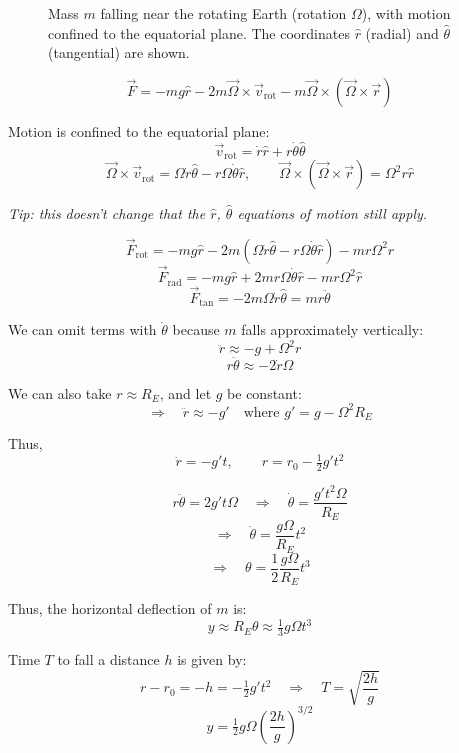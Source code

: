 \begin{example}

\begin{figure}[H]
  \centering
  \caption{Mass $m$ falling near the rotating Earth (rotation $\Omega$), with motion confined to the equatorial plane. The coordinates $\hat{r}$ (radial) and $\hat{\theta}$ (tangential) are shown.}
\end{figure}

\[
  \vec{F} = -mg\hat{r} - 2m\vec{\Omega}\times\vec{v}_\text{rot} - m\vec{\Omega}\times(\vec{\Omega}\times\vec{r})
\]

Motion is confined to the equatorial plane:
\[
  \vec{v}_\text{rot} = \dot{r}\hat{r} + r\dot{\theta}\hat{\theta}
\]
\[
  \vec{\Omega}\times\vec{v}_\text{rot} = \Omega\dot{r}\hat{\theta} - r\Omega\dot{\theta}\hat{r}, \qquad \vec{\Omega}\times(\vec{\Omega}\times\vec{r}) = \Omega^2 r\hat{r}
\]

\textit{Tip: this doesn't change that the $\hat{r}$, $\hat{\theta}$ equations of motion still apply.}

\[
  \vec{F}_\text{rot} = -mg\hat{r} - 2m(\Omega\dot{r}\hat{\theta} - r\Omega\dot{\theta}\hat{r}) - mr\Omega^2\hat{r}
\]
\[
  \vec{F}_\text{rad} = -mg\hat{r} + 2mr\Omega\dot{\theta}\hat{r} - mr\Omega^2\hat{r}
\]
\[
  \vec{F}_\text{tan} = -2m\Omega\dot{r}\hat{\theta} = mr\ddot{\theta}
\]

We can omit terms with $\dot{\theta}$ because $m$ falls approximately vertically:
\[
  \ddot{r} \approx -g + \Omega^2 r
\]
\[
  r\ddot{\theta} \approx -2\dot{r}\Omega
\]

We can also take $r \approx R_E$, and let $g$ be constant:
\[
  \Rightarrow \quad \ddot{r} \approx -g' \quad \text{where } g' = g - \Omega^2 R_E
\]

Thus,
\[
  \dot{r} = -g't, \qquad r = r_0 - \tfrac{1}{2}g't^2
\]

\[
  r\ddot{\theta} = 2g't\Omega \quad \Rightarrow \quad \dot{\theta} = \frac{g't^2\Omega}{R_E}
\]
\[
  \Rightarrow \quad \dot{\theta} = \frac{g\Omega}{R_E}t^2
\]
\[
  \Rightarrow \quad \theta = \frac{1}{2}\frac{g\Omega}{R_E}t^3
\]

Thus, the horizontal deflection of $m$ is:
\[
  y \approx R_E\theta \approx \tfrac{1}{3}g\Omega t^3
\]

Time $T$ to fall a distance $h$ is given by:
\[
  r - r_0 = -h = -\tfrac{1}{2}g't^2 \quad \Rightarrow \quad T = \sqrt{\frac{2h}{g}}
\]
\[
  y = \tfrac{1}{2}g\Omega\!\left(\frac{2h}{g}\right)^{3/2}
\]
\end{example}

